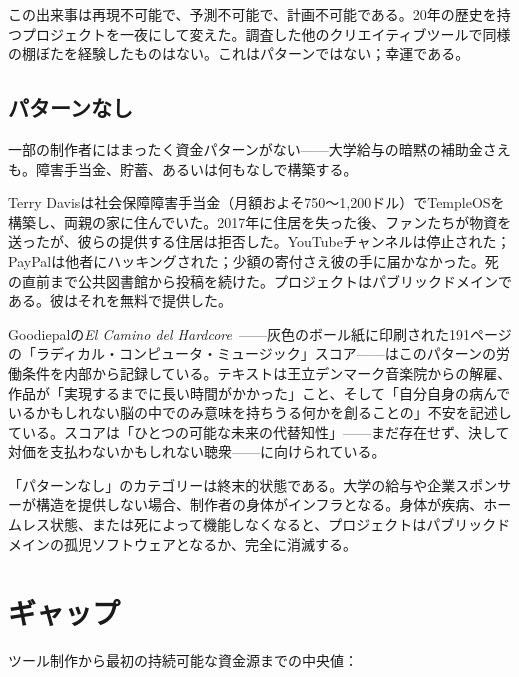 \documentclass[10pt,letterpaper,twocolumn]{article}
\begin{document}
この出来事は再現不可能で、予測不可能で、計画不可能である。20年の歴史を持つプロジェクトを一夜にして変えた。調査した他のクリエイティブツールで同様の棚ぼたを経験したものはない。これはパターンではない；幸運である。

\subsection{パターンなし}

一部の制作者にはまったく資金パターンがない——大学給与の暗黙の補助金さえも。障害手当金、貯蓄、あるいは何もなしで構築する。

Terry Davisは社会保障障害手当金（月額およそ750〜1,200ドル）でTempleOSを構築し、両親の家に住んでいた。2017年に住居を失った後、ファンたちが物資を送ったが、彼らの提供する住居は拒否した。YouTubeチャンネルは停止された；PayPalは他者にハッキングされた；少額の寄付さえ彼の手に届かなかった。死の直前まで公共図書館から投稿を続けた。プロジェクトはパブリックドメインである。彼はそれを無料で提供した。

Goodiepalの\emph{El Camino del Hardcore}~\citep{goodiepal2012elcamino}——灰色のボール紙に印刷された191ページの「ラディカル・コンピュータ・ミュージック」スコア——はこのパターンの労働条件を内部から記録している。テキストは王立デンマーク音楽院からの解雇、作品が「実現するまでに長い時間がかかった」こと、そして「自分自身の病んでいるかもしれない脳の中でのみ意味を持ちうる何かを創ることの」不安を記述している。スコアは「ひとつの可能な未来の代替知性」——まだ存在せず、決して対価を支払わないかもしれない聴衆——に向けられている。

「パターンなし」のカテゴリーは終末的状態である。大学の給与や企業スポンサーが構造を提供しない場合、制作者の身体がインフラとなる。身体が疾病、ホームレス状態、または死によって機能しなくなると、プロジェクトはパブリックドメインの孤児ソフトウェアとなるか、完全に消滅する。

\section{ギャップ}

ツール制作から最初の持続可能な資金源までの中央値：
\end{document}
